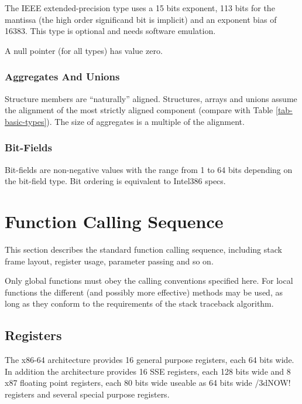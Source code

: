 The IEEE extended-precision type uses a 15 bits exponent, 113 bits for
the mantissa (the high order significand bit is implicit) and an
exponent bias of 16383.  This type is optional and needs software
emulation.

A null pointer (for all types) has value zero.

\subsubsection{Aggregates And Unions}

Structure members are ``naturally'' aligned.  Structures, arrays and
unions assume the alignment of the most strictly aligned component
(compare with Table \ref{tab-basic-types}). The size of aggregates is
a multiple of the alignment.

\subsubsection{Bit-Fields}

Bit-fields are non-negative values with the range from 1 to 64 bits
depending on the bit-field type. Bit ordering is equivalent to
Intel386 specs.



\section{Function Calling Sequence}

This section describes the standard function calling sequence,
including stack frame layout, register usage, parameter passing and so
on.

Only global functions must obey the calling conventions specified
here.  For local functions the different (and possibly more effective)
methods may be used, as long as they conform to the requirements of the
stack traceback algorithm.

\subsection{Registers}
\label{subsec-registers}

The x86-64 architecture provides 16 general purpose registers, each 64
bits wide. In addition the architecture provides 16 SSE registers,
each 128 bits wide and 8 x87 floating point registers, each 80 bits
wide useable as 64 bits wide \MMX/3dNOW! registers and several special
purpose registers.

